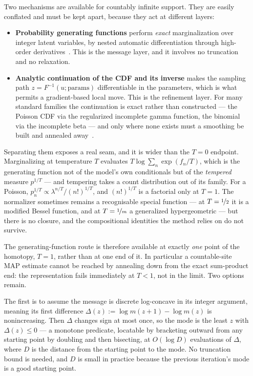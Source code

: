 Two mechanisms are available for countably infinite support. They are easily conflated and must be kept apart, because they act at different layers:
\begin{itemize}
    \item \textbf{Probability generating functions} perform \emph{exact} marginalization over integer latent variables, by nested automatic differentiation through high-order derivatives~\citep{Sheldon2018}. This is the message layer, and it involves no truncation and no relaxation.
    \item \textbf{Analytic continuation of the CDF and its inverse} makes the sampling path $z = F^{-1}(u; \text{params})$ differentiable in the parameters, which is what permits a gradient-based local move. This is the refinement layer. For many standard families the continuation is exact rather than constructed --- the Poisson CDF via the regularized incomplete gamma function, the binomial via the incomplete beta --- and only where none exists must a smoothing be built and annealed away~\citep{Wagner2024}.
\end{itemize}
Separating them exposes a real seam, and it is wider than the $T = 0$ endpoint. Marginalizing at temperature $T$ evaluates $T \log \sum_n \exp(f_n / T)$, which is the generating function not of the model's own conditionals but of the \emph{tempered} measure $p^{1/T}$ --- and tempering takes a count distribution out of its family. For a Poisson, $p_n^{1/T} \propto \lambda^{n/T} / (n!)^{1/T}$, and $(n!)^{1/T}$ is a factorial only at $T = 1$. The normalizer sometimes remains a recognisable special function --- at $T = \nicefrac{1}{2}$ it is a modified Bessel function, and at $T = \nicefrac{1}{m}$ a generalized hypergeometric --- but there is no closure, and the compositional identities the method relies on do not survive.

The generating-function route is therefore available at exactly \emph{one} point of the homotopy, $T = 1$, rather than at one end of it. In particular a countable-site MAP estimate cannot be reached by annealing down from the exact sum-product end: the representation fails immediately at $T < 1$, not in the limit. Two options remain.

The first is to assume the message is discrete log-concave in its integer argument, meaning its first difference $\Delta(z) := \log m(z+1) - \log m(z)$ is nonincreasing. Then $\Delta$ changes sign at most once, so the mode is the least $z$ with $\Delta(z) \leq 0$ --- a monotone predicate, locatable by bracketing outward from any starting point by doubling and then bisecting, at $O(\log D)$ evaluations of $\Delta$, where $D$ is the distance from the starting point to the mode. No truncation bound is needed, and $D$ is small in practice because the previous iteration's mode is a good starting point.

